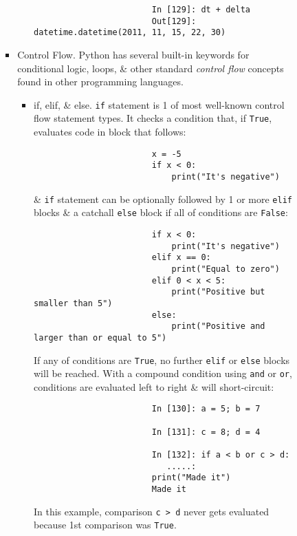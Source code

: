 \documentclass{article}
\begin{document}
\begin{enumerate}
\begin{itemize}
\begin{itemize}
\begin{itemize}
\begin{itemize}
\begin{verbatim}
						In [129]: dt + delta
						Out[129]: datetime.datetime(2011, 11, 15, 22, 30)
					\end{verbatim}
				\end{itemize}
				\item {\sf Control Flow.} Python has several built-in keywords for conditional logic, loops, \& other standard {\it control flow} concepts found in other programming languages.
				\begin{itemize}
					\item {\sf if, elif, \& else.} {\tt if} statement is 1 of most well-known control flow statement types. It checks a condition that, if {\tt True}, evaluates code in block that follows:
					\begin{verbatim}
						x = -5
						if x < 0:
						    print("It's negative")
					\end{verbatim}
					\& {\tt if} statement can be optionally followed by 1 or more {\tt elif} blocks \& a catchall {\tt else} block if all of conditions are {\tt False}:
					\begin{verbatim}
						if x < 0:
						    print("It's negative")
						elif x == 0:
						    print("Equal to zero")
						elif 0 < x < 5:
						    print("Positive but smaller than 5")
						else:
						    print("Positive and larger than or equal to 5")
					\end{verbatim}
					If any of conditions are {\tt True}, no further {\tt elif} or {\tt else} blocks will be reached. With a compound condition using {\tt and} or {\tt or}, conditions are evaluated left to right \& will short-circuit:
					\begin{verbatim}
						In [130]: a = 5; b = 7
						
						In [131]: c = 8; d = 4
						
						In [132]: if a < b or c > d:
						   .....:
						print("Made it")
						Made it
					\end{verbatim}
					In this example, comparison {\tt c > d} never gets evaluated because 1st comparison was {\tt True}.
					

\end{itemize}
\end{itemize}
\end{itemize}
\end{itemize}
\end{enumerate}
\end{document}

